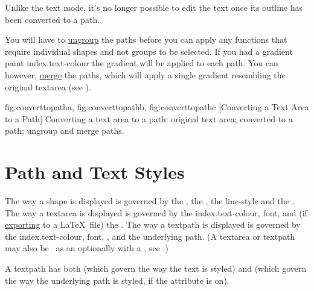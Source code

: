 \begin{information}
Unlike the text  mode, it's no longer possible to
edit the text once its outline has been converted to a path.
\end{information}

You will have to \hyperref[sec:grouping]{ungroup} the
\glspl*{path} before you can apply any functions that require
individual \glspl{shape} and not \glspl{group} to be selected.  If you
had a gradient paint \gls{index.text-colour} the gradient will be
applied to each \gls*{path}. You can however,
\hyperref[sec:mergepaths]{merge} the \glspl*{path}, which will apply
a single gradient resembling the original \gls*{textarea} (see
).

{
  {fig:converttopatha}{}{},
  {fig:converttopathb}{}{},
  {fig:converttopathc}{}{}
}
[Converting a Text Area to a Path]
{Converting a text area to a path:
 original text area;
 converted to a path;
 ungroup and merge paths.}



\chapter{Path and Text Styles}\label{sec:styles}

The way a \gls{shape} is displayed is governed by the 
, the , the 
\gls{line-style} and the . 
The way a \gls{textarea} is displayed is governed by the
\gls{index.text-colour}, \gls{font},  
and (if \hyperref[sec:exportimage]{exporting} to a \LaTeX\ file) the
. The way a \gls{textpath} is displayed is governed
by the \gls{index.text-colour}, \gls{font}, ,
 and the underlying path. (A
\gls*{textarea} or \gls*{textpath} may also be \rendered\ as an
 optionally with a , see
.)

A \gls{textpath} has both  (which govern the
way the text is styled) and  (which govern
the way the underlying path is styled, if the
 attribute is on).

